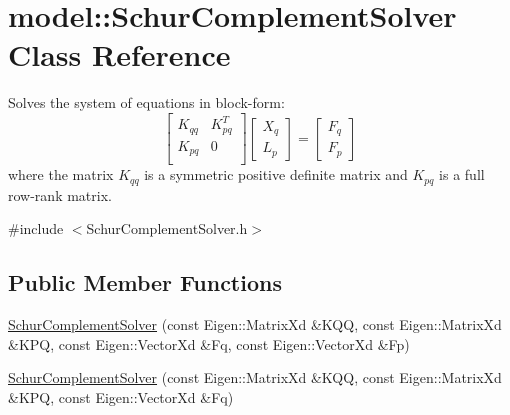 \hypertarget{classmodel_1_1_schur_complement_solver}{}\section{model\+:\+:Schur\+Complement\+Solver Class Reference}
\label{classmodel_1_1_schur_complement_solver}


Solves the system of equations in block-\/form\+: \[ \left[ \begin{array}{ll} K_{qq} & K_{pq}^T\\ K_{pq} & 0\\ \end{array} \right] \left[ \begin{array}{l} X_q\\ L_p \end{array} \right] = \left[ \begin{array}{l} F_q\\ F_p \end{array} \right] \] where the matrix $K_{qq}$ is a symmetric positive definite matrix and $K_{pq}$ is a full row-\/rank matrix.  




{\ttfamily \#include $<$Schur\+Complement\+Solver.\+h$>$}

\subsection*{Public Member Functions}
\begin{DoxyCompactItemize}
\item 
\hyperlink{classmodel_1_1_schur_complement_solver_abc909e0d7af7a69a33b5f6457c2f8017}{Schur\+Complement\+Solver} (const Eigen\+::\+Matrix\+Xd \&K\+Q\+Q, const Eigen\+::\+Matrix\+Xd \&K\+P\+Q, const Eigen\+::\+Vector\+Xd \&Fq, const Eigen\+::\+Vector\+Xd \&Fp)
\item 
\hyperlink{classmodel_1_1_schur_complement_solver_a3935db703cedca7977adb39ce149d0e6}{Schur\+Complement\+Solver} (const Eigen\+::\+Matrix\+Xd \&K\+Q\+Q, const Eigen\+::\+Matrix\+Xd \&K\+P\+Q, const Eigen\+::\+Vector\+Xd \&Fq)
\end{DoxyCompactItemize}

